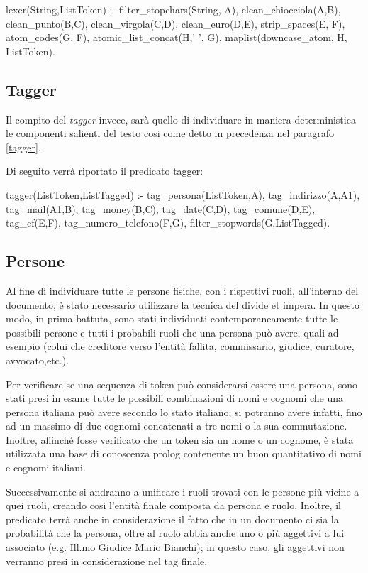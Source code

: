 \begin{prologcode}
lexer(String,ListToken) :-
    filter_stopchars(String, A),
    clean_chiocciola(A,B),
    clean_punto(B,C),
    clean_virgola(C,D),
    clean_euro(D,E),
    strip_spaces(E, F),
    atom_codes(G, F),
    atomic_list_concat(H,' ', G),
    maplist(downcase_atom, H, ListToken).
\end{prologcode}

\subsection{Tagger}
Il compito del \emph{tagger} invece, sarà quello di individuare in maniera deterministica le componenti salienti del testo cosi come detto in precedenza nel paragrafo \ref{tagger}.

Di seguito verrà riportato il predicato tagger:

\begin{prologcode}
tagger(ListToken,ListTagged) :-
    tag_persona(ListToken,A),
    tag_indirizzo(A,A1),
    tag_mail(A1,B),
    tag_money(B,C),
    tag_date(C,D),
    tag_comune(D,E),
    tag_cf(E,F),
    tag_numero_telefono(F,G),
    filter_stopwords(G,ListTagged).
\end{prologcode}

\subsection{Persone}
Al fine di individuare tutte le persone fisiche, con i rispettivi ruoli, all'interno del documento, è stato necessario utilizzare la tecnica del divide et impera. In questo modo, in prima battuta, sono stati individuati contemporaneamente tutte le possibili persone e tutti i probabili ruoli che una persona può avere, quali ad esempio (colui che creditore verso l'entità fallita, commissario, giudice, curatore, avvocato,etc.).

Per verificare se una sequenza di token può considerarsi essere una persona, sono stati presi in esame tutte le possibili combinazioni di nomi e cognomi che una persona italiana può avere secondo lo stato italiano; si potranno avere infatti, fino ad un massimo di due cognomi concatenati a tre nomi o la sua commutazione. Inoltre, affinché fosse verificato che un token sia un nome o un cognome, è stata utilizzata una base di conoscenza prolog contenente un buon quantitativo di nomi e cognomi italiani.

Successivamente si andranno a unificare i ruoli trovati con le persone più vicine a quei ruoli, creando cosi l'entità finale composta da persona e ruolo.
Inoltre, il predicato terrà anche in considerazione il fatto che in un documento ci sia la probabilità che la persona, oltre al ruolo abbia anche uno o più aggettivi a lui associato (e.g. Ill.mo Giudice Mario Bianchi); in questo caso, gli aggettivi non verranno presi in considerazione nel tag finale.

